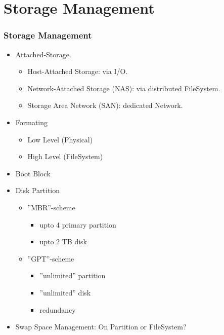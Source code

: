 \documentclass[aspectratio=169, xcolor=table, notheorems, hyperref={pdfpagelabels=false}]{beamer}
\begin{document}
\section{Storage Management}
\begin{frame}
\frametitle{Storage Management}
\begin{itemize}
\item Attached-Storage.
\begin{itemize}
\item Host-Attached Storage: via I/O.
\item Network-Attached Storage (NAS): via distributed FileSystem.
\item Storage Area Network (SAN): dedicated Network.
\end{itemize}
\item Formating
\begin{itemize}
\item Low Level (Physical)
\item High Level (FileSystem)
\end{itemize}
\item Boot Block
\item Disk Partition
\begin{itemize}
\item ''MBR''-scheme
\begin{itemize}
\item upto 4 primary partition
\item upto 2 TB disk
\end{itemize}
\item ''GPT''-scheme
\begin{itemize}
\item ''unlimited'' partition
\item ''unlimited'' disk
\item redundancy
\end{itemize}
\end{itemize}
\item Swap Space Management: On Partition or FileSystem?
\end{itemize}
\end{frame}

\end{document}
